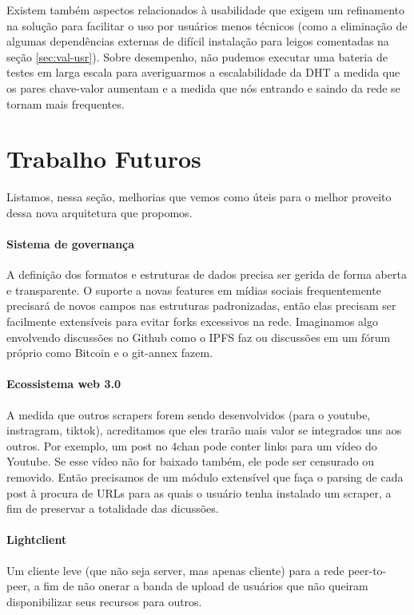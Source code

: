 Existem também aspectos relacionados à usabilidade que exigem um refinamento na solução para facilitar o uso por usuários menos técnicos (como a eliminação de algumas dependências externas de difícil instalação para leigos comentadas na seção \ref{sec:val-usr}).
Sobre desempenho, não pudemos executar uma bateria de testes em larga escala para averiguarmos a escalabilidade da DHT a medida que os pares chave-valor aumentam e a medida que nós entrando e saindo da rede se tornam mais frequentes.


\section{Trabalho Futuros}

Listamos, nessa seção, melhorias que vemos como úteis para o melhor proveito dessa nova arquitetura que propomos.

\paragraph{Sistema de governança}

A definição dos formatos e estruturas de dados precisa ser gerida de forma aberta e transparente.
O suporte a novas features em mídias sociais frequentemente precisará de novos campos nas estruturas padronizadas, então elas precisam ser facilmente extensíveis para evitar forks excessivos na rede.
Imaginamos algo envolvendo discussões no Github como o IPFS faz ou discussões em um fórum próprio como Bitcoin e o git-annex fazem.

\paragraph{Ecossistema web 3.0}

A medida que outros scrapers forem sendo desenvolvidos (para o youtube, instragram, tiktok), acreditamos que eles trarão mais valor se integrados uns aos outros.
Por exemplo, um post no 4chan pode conter links para um vídeo do Youtube.
Se esse vídeo não for baixado também, ele pode ser censurado ou removido.
Então precisamos de um módulo extensível que faça o parsing de cada post à procura de URLs para as quais o usuário tenha instalado um scraper, a fim de preservar a totalidade das dicussões.

\paragraph{Lightclient}

Um cliente leve (que não seja server, mas apenas cliente) para a rede peer-to-peer, a fim de não onerar a banda de upload de usuários que não queiram disponibilizar seus recursos para outros.

